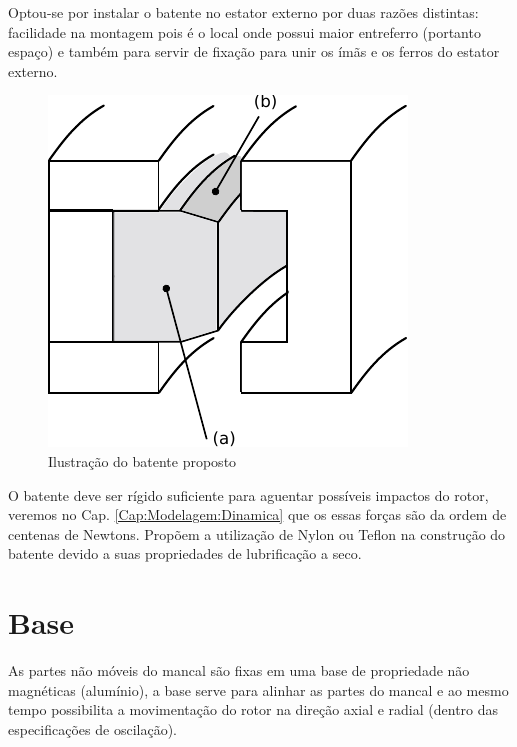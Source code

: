 Optou-se por instalar o batente no estator externo por duas razões distintas: facilidade na montagem pois  é o local onde possui maior entreferro (portanto espaço) e também para servir de fixação para unir os ímãs e os ferros do estator externo. 

\begin{figure}[th!]
\centering
\includegraphics[width=0.4\linewidth]{./Figs/mancais/mancal_batente_corte}
\caption{Ilustração do batente proposto}
\label{fig:mancal:batente:corte}
\end{figure}



O batente deve ser rígido suficiente para aguentar possíveis impactos do rotor, veremos no Cap. \ref{Cap:Modelagem:Dinamica} que os essas forças são da ordem de centenas de Newtons. Propõem a utilização de Nylon ou Teflon \cite{Johnson2001a} na construção do batente devido a suas propriedades de lubrificação a seco. 

\section{Base}

As partes não móveis do mancal são fixas em uma base de propriedade não magnéticas (alumínio), a base serve para alinhar as partes do mancal e ao mesmo tempo possibilita a movimentação do rotor na direção axial e radial (dentro das especificações de oscilação). 

%


